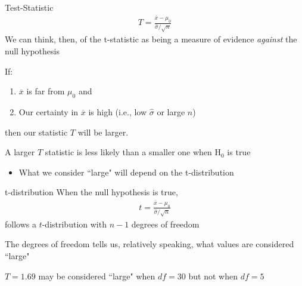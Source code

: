 \documentclass{beamer}
\begin{document}
\begin{frame}{Test-Statistic}
\begin{align*}
T = \frac{\overline{x} - \mu_0}{\hat{\sigma}/\sqrt{n}}
\end{align*}
We can think, then, of the t-statistic as being a measure of evidence \textit{against} the null hypothesis \\ \vspace{6mm}

If:
\begin{enumerate}
\item $\overline{x}$ is far from $\mu_0$ and
\item Our certainty in $\overline{x}$ is high (i.e., low $\hat{\sigma}$ or large $n$)
\end{enumerate}
then our statistic $T$ will be larger. \vspace{8mm}

A larger $T$ statistic is less likely than a smaller one when H$_0$ is true\\
\begin{itemize}
    \item What we consider ``large" will depend on the t-distribution
\end{itemize}
\end{frame}

\begin{frame}{t-distribution}
When the null hypothesis is true, 
\begin{align*}
t = \frac{\overline{x} - \mu_0}{\hat{\sigma}/\sqrt{n}}
\end{align*}
follows a $t$-distribution with $n-1$ degrees of freedom \\ \vspace{10mm}

The degrees of freedom tells us, relatively speaking, what values are considered ``large" \\ \vspace{4mm}

$T = 1.69$ may be considered ``large" when $df = 30$ but not when $df = 5$
\end{frame}
\end{document}
